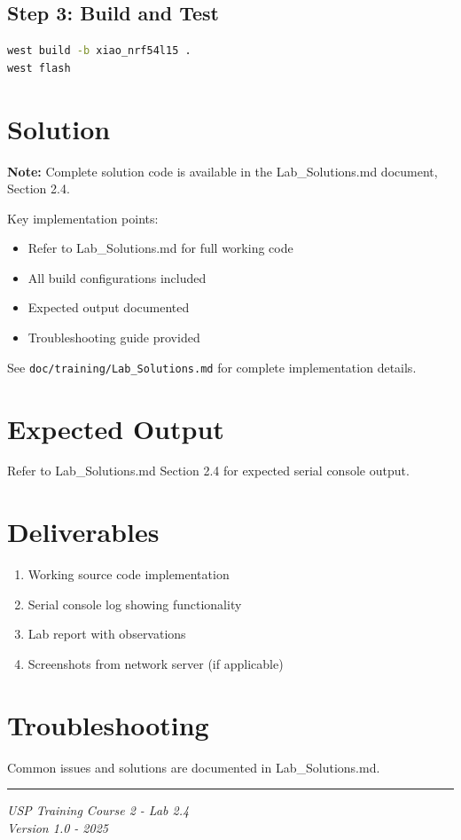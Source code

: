 \documentclass[11pt,a4paper]{article}
\begin{document}
\subsection{Step 3: Build and Test}
\begin{lstlisting}[language=bash]
west build -b xiao_nrf54l15 .
west flash
\end{lstlisting}

\section{Solution}

\begin{solutionbox}
\textbf{Note:} Complete solution code is available in the Lab\_Solutions.md document, Section 2.4.

Key implementation points:
\begin{itemize}
    \item Refer to Lab\_Solutions.md for full working code
    \item All build configurations included
    \item Expected output documented
    \item Troubleshooting guide provided
\end{itemize}

See \texttt{doc/training/Lab\_Solutions.md} for complete implementation details.
\end{solutionbox}

\section{Expected Output}

Refer to Lab\_Solutions.md Section 2.4 for expected serial console output.

\section{Deliverables}

\begin{enumerate}[itemsep=10pt]
    \item Working source code implementation
    \item Serial console log showing functionality
    \item Lab report with observations
    \item Screenshots from network server (if applicable)
\end{enumerate}

\section{Troubleshooting}

Common issues and solutions are documented in Lab\_Solutions.md.

\vfill
\noindent\rule{\textwidth}{0.4pt}
\begin{center}
\textit{USP Training Course 2 - Lab 2.4}\\
\textit{Version 1.0 - 2025}
\end{center}
\end{document}
